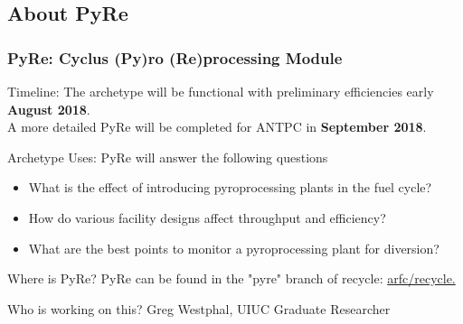 \subsection{About PyRe}
\begin{frame}
\frametitle{PyRe: Cyclus (Py)ro (Re)processing Module}
\begin{block}{Timeline:} 
	The archetype will be functional with preliminary efficiencies early \textbf{August 2018}. \\
	A more detailed PyRe will be completed for ANTPC in \textbf{September 2018}.
\end{block}
\begin{block}{Archetype Uses:} 
	PyRe will answer the following questions
	\begin{itemize}
		\item What is the effect of introducing pyroprocessing plants in the fuel cycle?
		\item How do various facility designs affect throughput and efficiency?
		\item What are the best points to monitor a pyroprocessing plant for diversion?
	\end{itemize}
\end{block}
\begin{block}{Where is PyRe?} 
	PyRe can be found in the "pyre" branch of recycle: 	\href{https://github.com/arfc/recycle}{arfc/recycle.} 
\end{block}
\begin{block}{Who is working on this?}
	Greg Westphal, UIUC Graduate Researcher
\end{block}
\end{frame}

